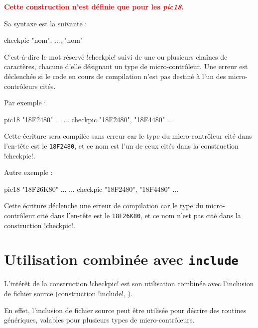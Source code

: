 


\thispagestyle{empty}

\textcolor{red}{\bf Cette construction n'est définie que pour les \emph{pic18}.}

Sa syntaxe est la suivante :

\begin{piccolo}
checkpic "nom", ..., "nom"
\end{piccolo}

C'est-à-dire le mot réservé \pic!checkpic! suivi de une ou plusieurs chaînes de caractères, chacune d'elle désignant un type de micro-contrôleur. Une erreur est déclenchée si le code en cours de compilation n'est pas destiné à l'un des micro-contrôleurs cités.

Par exemple :

\begin{piccolo}
pic18 "18F2480" ...
  ...
checkpic "18F2480", "18F4480"
  ...
\end{piccolo}

Cette écriture sera compilée sans erreur car le type du micro-contrôleur cité dans l'en-tête est le \texttt{18F2480}, et ce nom est l'un de ceux cités dans la construction \pic!checkpic!.

Autre exemple :

\begin{piccolo}
pic18 "18F26K80" ...
  ...
checkpic "18F2480", "18F4480"
  ...
\end{piccolo}

Cette écriture déclenche une erreur de compilation car le type du micro-contrôleur cité dans l'en-tête est le \texttt{18F26K80}, et ce nom n'est pas cité dans la construction \pic!checkpic!.




\section{Utilisation combinée avec \texttt{include}}
L'intérêt de la construction \pic!checkpic! est son utilisation combinée avec l'inclusion de fichier source (construction \pic!include!, ).

En effet, l'inclusion de fichier source peut être utilisée pour décrire des routines génériques, valables pour plusieurs types de micro-contrôleurs.

